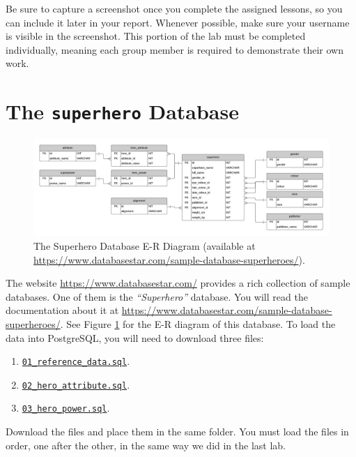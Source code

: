 \documentclass{article}
\begin{document}
Be sure to capture a screenshot once you complete the assigned lessons, so you can include it later in your report. Whenever possible, make sure your username is visible in the screenshot. This portion of the lab must be completed individually, meaning each group member is required to demonstrate their own work.

\section{The \texttt{superhero} Database}

\begin{figure}[t]
 \centering
 \includegraphics[width=\textwidth]{figures/erd}
 \caption{The Superhero Database E-R Diagram (available at \url{https://www.databasestar.com/sample-database-superheroes/}).}
 \label{fig:erd}
\end{figure}

The website \url{https://www.databasestar.com/} provides a rich collection of sample databases. One of them is the \textit{``Superhero''} database. You will read the documentation about it at \url{https://www.databasestar.com/sample-database-superheroes/}. See Figure \ref{fig:erd} for the E-R diagram of this database. To load the data into PostgreSQL, you will need to download three files:

\begin{enumerate}
  \item \href{https://drive.google.com/file/d/117RF0tbGk4LHhpcnBGr13Jl7C7GdUaB4/view?usp=drive_link}{\texttt{01\_reference\_data.sql}}.
  \item \href{https://drive.google.com/file/d/1j7lT45SjCtCo2Hc1fP5ej-Uopl0V1ZJR/view?usp=drive_link}{\texttt{02\_hero\_attribute.sql}}.
  \item \href{https://drive.google.com/file/d/1cV0cqxUjbCV1k67CPb-9wYkS_ymcF4Kq/view?usp=drive_link}{\texttt{03\_hero\_power.sql}}.
\end{enumerate}

Download the files and place them in the same folder. You must load the files in order, one after the other, in the same way we did in the last lab.
\end{document}
